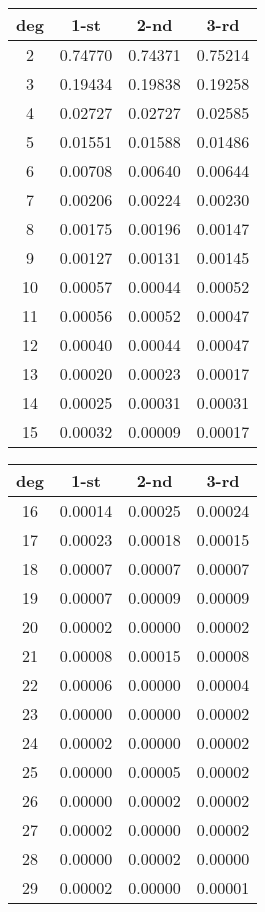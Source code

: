 \begin{tabular}{ | c | l | l | l |}
\hline
deg & \multicolumn{1}{c|}{1-st} & \multicolumn{1}{c|}{2-nd} & \multicolumn{1}{c|}{3-rd} \\
\hline
2  & 0.74770 & 0.74371 & 0.75214 \\
3  & 0.19434 & 0.19838 & 0.19258 \\
4  & 0.02727 & 0.02727 & 0.02585 \\
5  & 0.01551 & 0.01588 & 0.01486 \\
6  & 0.00708 & 0.00640 & 0.00644 \\
7  & 0.00206 & 0.00224 & 0.00230 \\
8  & 0.00175 & 0.00196 & 0.00147 \\
9  & 0.00127 & 0.00131 & 0.00145 \\
10 & 0.00057 & 0.00044 & 0.00052 \\
11 & 0.00056 & 0.00052 & 0.00047 \\
12 & 0.00040 & 0.00044 & 0.00047 \\
13 & 0.00020 & 0.00023 & 0.00017 \\
14 & 0.00025 & 0.00031 & 0.00031 \\
15 & 0.00032 & 0.00009 & 0.00017 \\
\hline
\end{tabular}
\hfill
\begin{tabular}{ | c | l | l | l |}
\hline
deg & \multicolumn{1}{c|}{1-st} & \multicolumn{1}{c|}{2-nd} & \multicolumn{1}{c|}{3-rd} \\
\hline
16 & 0.00014 & 0.00025 & 0.00024 \\
17 & 0.00023 & 0.00018 & 0.00015 \\
18 & 0.00007 & 0.00007 & 0.00007 \\
19 & 0.00007 & 0.00009 & 0.00009 \\
20 & 0.00002 & 0.00000 & 0.00002 \\
21 & 0.00008 & 0.00015 & 0.00008 \\
22 & 0.00006 & 0.00000 & 0.00004 \\
23 & 0.00000 & 0.00000 & 0.00002 \\
24 & 0.00002 & 0.00000 & 0.00002 \\
25 & 0.00000 & 0.00005 & 0.00002 \\
26 & 0.00000 & 0.00002 & 0.00002 \\
27 & 0.00002 & 0.00000 & 0.00002 \\
28 & 0.00000 & 0.00002 & 0.00000 \\
29 & 0.00002 & 0.00000 & 0.00001 \\
\hline
\end{tabular}
